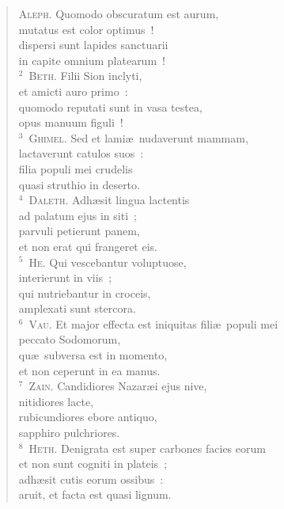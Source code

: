 \begin{flushleft}\begin{verse}\vspace{-19pt}\textsc{Aleph.} Quomodo obscuratum est aurum,\\ mutatus est color optimus~!\\ dispersi sunt lapides sanctuarii\\ in capite omnium platearum~!\\
${}^{2}$~\textsc{Beth.} Filii Sion inclyti,\\ et amicti auro primo~:\\ quomodo reputati sunt in vasa testea,\\ opus manuum figuli~!\\
${}^{3}$~\textsc{Ghimel.} Sed et lami\ae\ nudaverunt mammam,\\ lactaverunt catulos suos~:\\ filia populi mei crudelis\\ quasi struthio in deserto.\\
${}^{4}$~\textsc{Daleth.} Adh\ae sit lingua lactentis\\ ad palatum ejus in siti~;\\ parvuli petierunt panem,\\ et non erat qui frangeret eis.\\
${}^{5}$~\textsc{He.} Qui vescebantur voluptuose,\\ interierunt in viis~;\\ qui nutriebantur in croceis,\\ amplexati sunt stercora.\\
${}^{6}$~\textsc{Vau.} Et major effecta est iniquitas fili\ae\ populi mei\\ peccato Sodomorum,\\ qu\ae\ subversa est in momento,\\ et non ceperunt in ea manus.\\
${}^{7}$~\textsc{Zain.} Candidiores Nazar\ae i ejus nive,\\ nitidiores lacte,\\ rubicundiores ebore antiquo,\\ sapphiro pulchriores.\\
${}^{8}$~\textsc{Heth.} Denigrata est super carbones facies eorum\\ et non sunt cogniti in plateis~;\\ adh\ae sit cutis eorum ossibus~:\\ aruit, et facta est quasi lignum.\\

\end{verse}
\end{flushleft}
